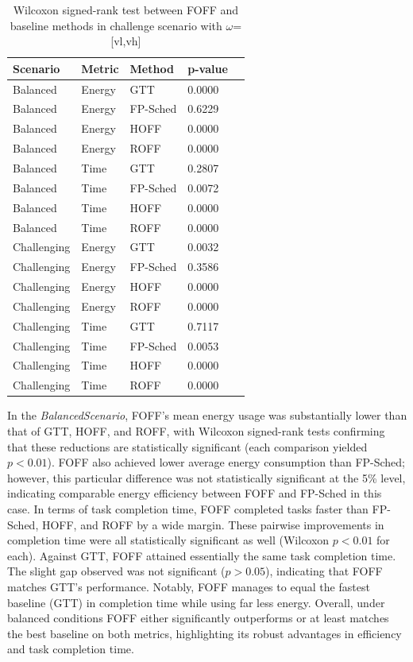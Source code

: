 \documentclass[iicol]{sn-jnl}
\begin{document}
\begin{table}[ht]
    \centering
    \caption{Wilcoxon signed-rank test between FOFF and baseline methods in challenge scenario with $\omega$=[vl,vh]}
    \label{tab:wilcoxon}
    \begin{tabular}{lllll}
    \toprule
    \textbf{Scenario} & \textbf{Metric} & \textbf{Method} & \textbf{p-value}\\
    \midrule
    Balanced   & Energy & GTT       & 0.0000 \\
    Balanced   & Energy & FP-Sched  & 0.6229 \\
    Balanced   & Energy & HOFF      & 0.0000 \\
    Balanced   & Energy & ROFF      & 0.0000 \\
    Balanced   & Time   & GTT       & 0.2807 \\
    Balanced   & Time   & FP-Sched  & 0.0072 \\
    Balanced   & Time   & HOFF      & 0.0000 \\
    Balanced   & Time   & ROFF      & 0.0000 \\
    \midrule
    Challenging & Energy & GTT       & 0.0032 \\
    Challenging & Energy & FP-Sched  & 0.3586 \\
    Challenging & Energy & HOFF      & 0.0000 \\
    Challenging & Energy & ROFF      & 0.0000 \\
    Challenging & Time   & GTT       & 0.7117 \\
    Challenging & Time   & FP-Sched  & 0.0053 \\
    Challenging & Time   & HOFF      & 0.0000 \\
    Challenging & Time   & ROFF      & 0.0000 \\
    \bottomrule
    \end{tabular}
\end{table}
    
In the \textit{BalancedScenario}, FOFF’s mean energy usage was substantially lower than that of GTT, HOFF, and ROFF, with Wilcoxon signed-rank tests confirming that these reductions are statistically significant (each comparison yielded $p < 0.01$). FOFF also achieved lower average energy consumption than FP-Sched; however, this particular difference was not statistically significant at the 5\% level, indicating comparable energy efficiency between FOFF and FP-Sched in this case. In terms of task completion time, FOFF completed tasks faster than FP-Sched, HOFF, and ROFF by a wide margin. These pairwise improvements in completion time were all statistically significant as well (Wilcoxon $p < 0.01$ for each). Against GTT, FOFF attained essentially the same task completion time. The slight gap observed was not significant ($p > 0.05$), indicating that FOFF matches GTT’s performance. Notably, FOFF manages to equal the fastest baseline (GTT) in completion time while using far less energy. Overall, under balanced conditions FOFF either significantly outperforms or at least matches the best baseline on both metrics, highlighting its robust advantages in efficiency and task completion time.
\end{document}

